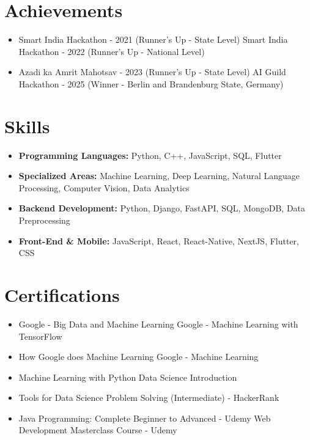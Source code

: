 \documentclass[a4paper,10pt]{article}
\begin{document}
\section*{Achievements}
\begin{itemize}
\item Smart India Hackathon - 2021 (Runner's Up - State Level) \hfill Smart India Hackathon - 2022 (Runner's Up - National Level)
\item Azadi ka Amrit Mahotsav - 2023 (Runner's Up - State Level) \hfill AI Guild Hackathon - 2025 (Winner - Berlin and Brandenburg State, Germany)
\end{itemize}

\section*{Skills}
\begin{itemize}
  \item \textbf{Programming Languages:} Python, C++, JavaScript, SQL, Flutter
  \item \textbf{Specialized Areas:} Machine Learning, Deep Learning, Natural Language Processing, Computer Vision, Data Analytics
  \item \textbf{Backend Development:} Python, Django, FastAPI, SQL, MongoDB, Data Preprocessing
  \item \textbf{Front-End \& Mobile:} JavaScript, React, React-Native, NextJS, Flutter, CSS
\end{itemize}

\section*{Certifications}
\begin{itemize}
\item Google - Big Data and Machine Learning \hfill Google - Machine Learning with TensorFlow
\item How Google does Machine Learning \hfill Google - Machine Learning
\item Machine Learning with Python \hfill Data Science Introduction
\item Tools for Data Science \hfill Problem Solving (Intermediate) - HackerRank
\item Java Programming: Complete Beginner to Advanced - Udemy \hfill Web Development Masterclass Course - Udemy
\end{itemize}
\end{document}
